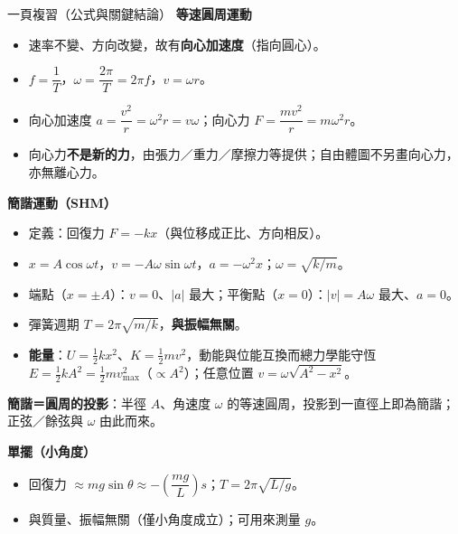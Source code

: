 \documentclass[11pt]{article}
\begin{document}
\begin{補充框}{一頁複習（公式與關鍵結論）}
\textbf{等速圓周運動}
\begin{itemize}\setlength{\itemsep}{1pt}
\item 速率不變、方向改變，故有\textbf{向心加速度}（指向圓心）。
\item $f=\dfrac1T$，$\omega=\dfrac{2\pi}{T}=2\pi f$，$v=\omega r$。
\item 向心加速度 $a=\dfrac{v^2}{r}=\omega^2 r=v\omega$；向心力 $F=\dfrac{mv^2}{r}=m\omega^2 r$。
\item 向心力\textbf{不是新的力}，由張力／重力／摩擦力等提供；自由體圖不另畫向心力，亦無離心力。
\end{itemize}

\textbf{簡諧運動（SHM）}
\begin{itemize}\setlength{\itemsep}{1pt}
\item 定義：回復力 $F=-kx$（與位移成正比、方向相反）。
\item $x=A\cos\omega t$，$v=-A\omega\sin\omega t$，$a=-\omega^2 x$；$\omega=\sqrt{k/m}$。
\item 端點（$x=\pm A$）：$v=0$、$|a|$ 最大；平衡點（$x=0$）：$|v|=A\omega$ 最大、$a=0$。
\item 彈簧週期 $T=2\pi\sqrt{m/k}$，\textbf{與振幅無關}。
\item \textbf{能量}：$U=\tfrac12 kx^2$、$K=\tfrac12 mv^2$，動能與位能互換而總力學能守恆 $E=\tfrac12 kA^2=\tfrac12 mv_{\max}^2$（$\propto A^2$）；任意位置 $v=\omega\sqrt{A^2-x^2}$。
\end{itemize}

\textbf{簡諧＝圓周的投影}：半徑 $A$、角速度 $\omega$ 的等速圓周，投影到一直徑上即為簡諧；正弦／餘弦與 $\omega$ 由此而來。

\textbf{單擺（小角度）}
\begin{itemize}\setlength{\itemsep}{1pt}
\item 回復力 $\approx mg\sin\theta\approx -\left(\dfrac{mg}{L}\right)s$；$T=2\pi\sqrt{L/g}$。
\item 與質量、振幅無關（僅小角度成立）；可用來測量 $g$。
\end{itemize}
\end{補充框}
\end{document}
